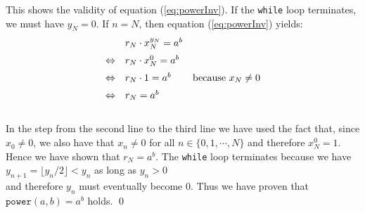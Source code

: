 This shows the validity of equation (\ref{eq:powerInv}).   If the \texttt{while} loop
terminates, we must have $y_N = 0$.  If $n=N$, then equation (\ref{eq:powerInv}) yields:
\\[0.2cm]
\hspace*{1.3cm}
$$
\begin{array}[t]{cll}
                 & r_N \cdot x_N^{y_N} = a^b \\[0.2cm]
\Leftrightarrow  & r_N \cdot x_N^{0}  = a^b \\[0.2cm]
\Leftrightarrow  & r_N \cdot 1       = a^b  & \mbox{because $x_N \not= 0$} \\[0.2cm]
\Leftrightarrow  & r_N               = a^b
\end{array}
$$
\\[0.2cm]
In the step from the second line to the third line we have used the fact that, since $x_0 \not= 0$, we also
have that $x_n \not= 0$ for all $n \in \{0,1, \cdots, N\}$ and therefore $x_N^0 = 1$.  Hence we have shown that $r_N = a^b$.  The
\texttt{while} loop terminates because we have 
\\[0.2cm]
\hspace*{1.3cm}
$y_{n+1} = \lfloor y_n / 2 \rfloor < y_n$ \quad as long as \quad $y_n > 0$
\\[0.2cm]
and therefore $y_n$ must eventually become $0$.  Thus we have proven that
$\texttt{power}(a,b) =a^b$ holds. \qed


